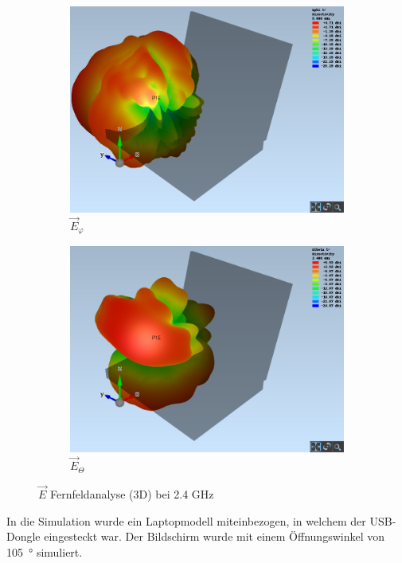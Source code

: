 \begin{figure}[h!]
	\begin{subfigure}[b]{0.48\textwidth}
		\includegraphics[width=1\textwidth]{../fig/plt/crazy_stuff_l4_pcb_v2c_laptop_1a_105_2ghz4_3d_farfield_ephi_xyz.png}
		\caption{$\vec{E}_{\varphi}$}
	\end{subfigure}
	\begin{subfigure}[b]{0.48\textwidth}
		\includegraphics[width=1\textwidth]{../fig/plt/crazy_stuff_l4_pcb_v2c_laptop_1a_105_2ghz4_3d_farfield_etheta_xyz.png}
		\caption{$\vec{E}_{\Theta}$}
	\end{subfigure}
	\caption{$\vec{E}$ Fernfeldanalyse (3D) bei 2.4 GHz}
\end{figure}

In die Simulation wurde ein Laptopmodell miteinbezogen, in welchem der
USB-Dongle eingesteckt war. Der Bildschirm wurde mit einem Öffnungswinkel
von \SI{105}{\degree} simuliert.

